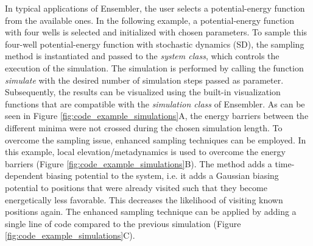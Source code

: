 In typical applications of Ensembler, the user selects a potential-energy function from the available ones. In the following example, a potential-energy function with four wells is selected and initialized with chosen parameters. 
To sample this four-well potential-energy function with stochastic dynamics (SD),\cite{Brunger1984} the sampling method is instantiated and passed to the \textit{system class}, which controls the execution of the simulation. 
The simulation is performed by calling the function \textit{simulate} with the desired number of simulation steps passed as parameter. 
Subsequently, the results can be visualized using the built-in visualization functions that are compatible with the \textit{simulation class} of Ensembler.  
As can be seen in Figure \ref{fig:code_example_simulations}A, the energy barriers between the different minima were not crossed during the chosen simulation length. 
To overcome the sampling issue, enhanced sampling techniques can be employed.\cite{Pohorille2010} 
In this example, local elevation\cite{Huber1994}/metadynamics\cite{Laio2002} is used to overcome the energy barriers (Figure \ref{fig:code_example_simulations}B).
The method adds a time-dependent biasing potential to the system, i.e. it adds a Gaussian biasing potential to positions that were already visited such that they become energetically less favorable. This decreases the likelihood of visiting known positions again. 
The enhanced sampling technique can be applied by adding a single line of code compared to the previous simulation (Figure \ref{fig:code_example_simulations}C).

